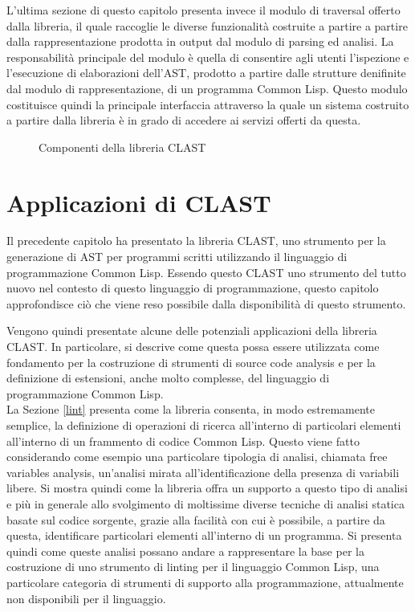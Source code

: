 \documentclass{book}
\newcommand{\image}[4]{
  \begin{figure}[H]
  \makebox[\textwidth][c]{
    \texttt{[image: \#1]}
  }
  \caption{#2}
  \label{#3}
  \end{figure}
}
\begin{document}
L'ultima sezione di questo capitolo presenta invece il modulo di traversal
offerto dalla libreria, il quale raccoglie le diverse funzionalità costruite a
partire a partire dalla rappresentazione prodotta in output dal modulo di
parsing ed analisi. La responsabilità principale del modulo è quella di
consentire agli utenti l'ispezione e l'esecuzione di elaborazioni dell'AST,
prodotto a partire dalle strutture denifinite dal modulo di rappresentazione, di
un programma Common Lisp. Questo modulo costituisce quindi la principale
interfaccia attraverso la quale un sistema costruito a partire dalla libreria è
in grado di accedere ai servizi offerti da questa.

\image{img/clast-architecture.png}
      {Componenti della libreria CLAST}
      {fig:clast-architecture}
      {0.5}





\endgroup

\begingroup
\let\clearpage\relax

\chapter{Applicazioni di CLAST}
\label{applications}

Il precedente capitolo ha presentato la libreria CLAST, uno strumento per la
generazione di AST per programmi scritti utilizzando il linguaggio di
programmazione Common Lisp. Essendo questo CLAST uno strumento del tutto nuovo
nel contesto di questo linguaggio di programmazione, questo capitolo
approfondisce ciò che viene reso possibile dalla disponibilità di questo
strumento.

Vengono quindi presentate alcune delle potenziali applicazioni della libreria
CLAST. In particolare, si descrive come questa possa essere utilizzata come
fondamento per la costruzione di strumenti di source code analysis e per la
definizione di estensioni, anche molto complesse, del linguaggio di
programmazione Common Lisp.\\

La Sezione \ref{lint} presenta come la libreria consenta, in modo estremamente
semplice, la definizione di operazioni di ricerca all’interno di particolari
elementi all’interno di un frammento di codice Common Lisp. Questo viene fatto
considerando come esempio una particolare tipologia di analisi, chiamata free
variables analysis, un’analisi mirata all’identificazione della presenza di
variabili libere. Si mostra quindi come la libreria offra un supporto a questo
tipo di analisi e più in generale allo svolgimento di moltissime diverse
tecniche di analisi statica basate sul codice sorgente, grazie alla facilità con
cui è possibile, a partire da questa, identificare particolari elementi
all’interno di un programma. Si presenta quindi come queste analisi possano
andare a rappresentare la base per la costruzione di uno strumento di linting
per il linguaggio Common Lisp, una particolare categoria di strumenti di
supporto alla programmazione, attualmente non disponibili per il linguaggio.\\
\end{document}
